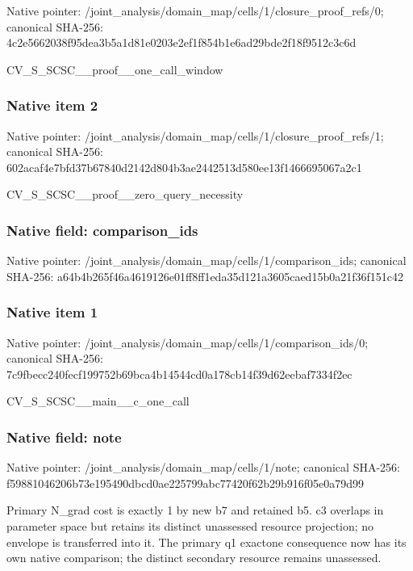 \documentclass[10pt,a4paper]{article}
\begin{document}
Native pointer: /joint\_analysis/domain\_m\allowbreak{}ap/cells/1/closure\_proof\allowbreak{}\_refs/0; canonical SHA-256: 4c2e5662038f95dea3b5a1d8\allowbreak{}1e0203e2ef1f854b1e6ad29b\allowbreak{}de2f18f9512c3c6d


CV\_S\_SCSC\_\_proof\_\_one\_call\_window


\subsubsection{Native item 2}


Native pointer: /joint\_analysis/domain\_m\allowbreak{}ap/cells/1/closure\_proof\allowbreak{}\_refs/1; canonical SHA-256: 602acaf4e7bfd37b67840d21\allowbreak{}42d804b3ae2442513d580ee1\allowbreak{}3f1466695067a2c1


CV\_S\_SCSC\_\_proof\_\_zero\_query\_necessity


\subsubsection{Native field: comparison\_ids}


Native pointer: /joint\_analysis/domain\_m\allowbreak{}ap/cells/1/comparison\_id\allowbreak{}s; canonical SHA-256: a64b4b265f46a4619126e01f\allowbreak{}f8ff1eda35d121a3605caed1\allowbreak{}5b0a21f36f151c42



\subsubsection{Native item 1}


Native pointer: /joint\_analysis/domain\_m\allowbreak{}ap/cells/1/comparison\_id\allowbreak{}s/0; canonical SHA-256: 7c9fbecc240fecf199752b69\allowbreak{}bca4b14544cd0a178cb14f39\allowbreak{}d62eebaf7334f2ec


CV\_S\_SCSC\_\_main\_\_c\_one\_call


\subsubsection{Native field: note}


Native pointer: /joint\_analysis/domain\_map/cells/1/note; canonical SHA-256: f59881046206b73e195490db\allowbreak{}cd0ae225799abc77420f62b2\allowbreak{}9b916f05e0a79d99


Primary N\_grad cost is exactly 1 by new b7 and retained b5. c3 overlaps in parameter space but retains its distinct unassessed resource projection; no envelope is transferred into it. The primary q1 exactone consequence now has its own native comparison; the distinct secondary resource remains unassessed.
\end{document}
